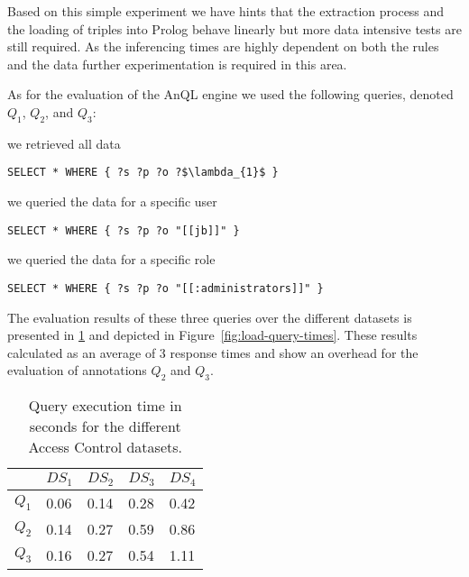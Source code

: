 Based on this simple experiment we have hints that the extraction process and the loading of triples into Prolog behave
linearly but more data intensive tests are still required. As the inferencing times are highly dependent on both the
rules and the data further experimentation is required in this area.


As for the evaluation of the AnQL engine we used the following queries, denoted $Q_1$, $Q_2$, and $Q_3$:
%
\begin{description}[noitemsep]
\item [$Q_1$:] we retrieved all data
  \begin{lstlisting}[basicstyle=\tt\small,mathescape,frame=none,numbers=none]
SELECT * WHERE { ?s ?p ?o ?$\lambda_{1}$ } 
  \end{lstlisting}

\item [$Q_2$:] we queried the data for a specific user 
  \begin{lstlisting}[basicstyle=\tt\small,frame=none,numbers=none]
SELECT * WHERE { ?s ?p ?o "[[jb]]" } 
  \end{lstlisting}

\item [$Q_3$:] we queried the data for a specific role
  \begin{lstlisting}[basicstyle=\tt\small,frame=none,numbers=none]
SELECT * WHERE { ?s ?p ?o "[[:administrators]]" } 
  \end{lstlisting}

\end{description}
% 
The evaluation results of these three queries over the different datasets is presented in
\cref{fig:anql-evaluation} and depicted in Figure~\ref{fig:load-query-times}.
%
These results calculated as an average of 3 response times and show an overhead for the evaluation of annotations $Q_2$
and $Q_3$.


\begin{table} [t]
\centering
\caption{Query execution time in seconds for the different Access Control datasets.}
\label{fig:anql-evaluation}
\begin{tabular}{lllll}
\toprule
& $DS_1$  & $DS_2$  & $DS_3$  & $DS_4$  \\
\midrule
$Q_1$ & 0.06  & 0.14   & 0.28   & 0.42   \\
$Q_2$ & 0.14  & 0.27   & 0.59   & 0.86   \\
$Q_3$ & 0.16  & 0.27   & 0.54   & 1.11   \\
\bottomrule
\end{tabular}
\end{table}

\begin{figure*}[t]\scriptsize
  \centering
  \caption{Load and query execution times for the different Access Control datasets}
  \label{fig:load-query-times} 
\end{figure*}


